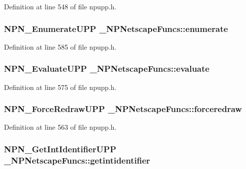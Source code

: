 Definition at line 548 of file npupp.h.

\hypertarget{struct___n_p_netscape_funcs_a4be53a2cf3fc4e6b487ee6ff32621fd8}{
\subsubsection[{enumerate}]{\setlength{\rightskip}{0pt plus 5cm}NPN\_\-EnumerateUPP {\bf \_\-NPNetscapeFuncs::enumerate}}}
\label{struct___n_p_netscape_funcs_a4be53a2cf3fc4e6b487ee6ff32621fd8}


Definition at line 585 of file npupp.h.

\hypertarget{struct___n_p_netscape_funcs_ad585928d0f332de3f0193e8bf5f4a5a6}{
\subsubsection[{evaluate}]{\setlength{\rightskip}{0pt plus 5cm}NPN\_\-EvaluateUPP {\bf \_\-NPNetscapeFuncs::evaluate}}}
\label{struct___n_p_netscape_funcs_ad585928d0f332de3f0193e8bf5f4a5a6}


Definition at line 575 of file npupp.h.

\hypertarget{struct___n_p_netscape_funcs_aaa78ba91b0ac4e1a5d0b8902f013b8a8}{
\subsubsection[{forceredraw}]{\setlength{\rightskip}{0pt plus 5cm}NPN\_\-ForceRedrawUPP {\bf \_\-NPNetscapeFuncs::forceredraw}}}
\label{struct___n_p_netscape_funcs_aaa78ba91b0ac4e1a5d0b8902f013b8a8}


Definition at line 563 of file npupp.h.

\hypertarget{struct___n_p_netscape_funcs_ae7a860e929ae8b25d57fd2b658896da8}{
\subsubsection[{getintidentifier}]{\setlength{\rightskip}{0pt plus 5cm}NPN\_\-GetIntIdentifierUPP {\bf \_\-NPNetscapeFuncs::getintidentifier}}}
\label{struct___n_p_netscape_funcs_ae7a860e929ae8b25d57fd2b658896da8}


